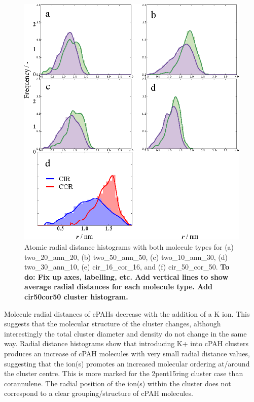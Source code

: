 %
\begin{figure}[!tbh]
\centering
\includegraphics[width=0.8\linewidth]{Figures/radii_histograms_aa.eps}
\caption{Atomic radial distance histograms with both molecule types for (a) two\_20\_ann\_20, (b) two\_50\_ann\_50, (c) two\_10\_ann\_30, (d) two\_30\_ann\_10, (e) cir\_16\_cor\_16, and (f) cir\_50\_cor\_50. \textbf{To do: Fix up axes, labelling, etc. Add vertical lines to show average radial distances for each molecule type. Add cir50cor50 cluster histogram.}}
\label{fig:radialdists_atomic}
\end{figure}
%

Molecule radial distances of cPAHs decrease %
with the addition of a K ion. This suggests that the molecular structure of the cluster changes, although interestingly the total cluster diameter and density do not change in the same way. Radial distance histograms show that introducing K+ into cPAH clusters produces an increase of cPAH molecules with very small radial distance values, suggesting that the ion(s) promotes an increased molecular ordering at/around the cluster centre. This is more marked for the 2pent15ring cluster case than corannulene. 
The radial position of the ion(s) within the cluster does not correspond to a clear grouping/structure of cPAH molecules. %


